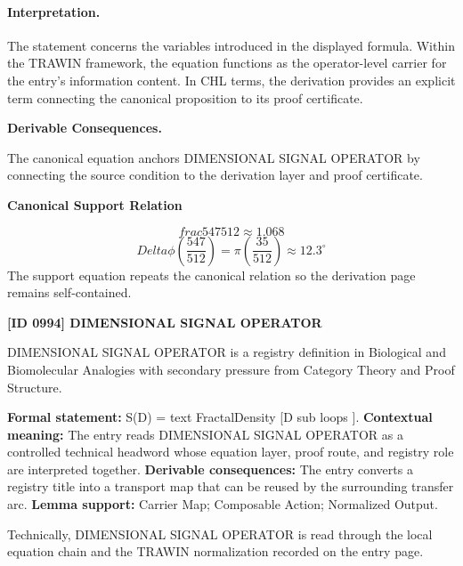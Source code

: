 \paragraph{Interpretation.}
The statement concerns the variables introduced in the displayed formula. Within the TRAWIN framework, the equation functions as the operator-level carrier for the entry’s information content. In CHL terms, the derivation provides an explicit term connecting the canonical proposition to its proof certificate.

\par\vspace{0.35em}
\noindent\textbf{Derivable Consequences.}\quad
\begingroup
\footnotesize
\raggedright
The canonical equation anchors DIMENSIONAL SIGNAL OPERATOR by connecting the source condition to the derivation layer and proof certificate.
\par\endgroup

\noindent\textbf{Canonical Support Relation}\par
\[
frac{547}{512} \approx 1.068
\]
\[
Delta\phi\left(\frac{547}{512}\right) = \pi\left(\frac{35}{512}\right) \approx 12.3^\circ
\]
\noindent The support equation repeats the canonical relation so the derivation page remains self-contained.\par

\clearpage
\noindent\textbf{[ID 0994] DIMENSIONAL SIGNAL OPERATOR}\par
\vspace{0.35em}
\begingroup\small
{}
DIMENSIONAL SIGNAL OPERATOR is a registry definition in Biological and Biomolecular Analogies with secondary pressure from Category Theory and Proof Structure.

\begingroup\footnotesize\setlength{\emergencystretch}{3em}\sloppy
\textbf{Formal statement:} S(D) = text FractalDensity [D sub loops ]. \textbf{Contextual meaning:} The entry reads DIMENSIONAL SIGNAL OPERATOR as a controlled technical headword whose equation layer, proof route, and registry role are interpreted together. \textbf{Derivable consequences:} The entry converts a registry title into a transport map that can be reused by the surrounding transfer arc. \textbf{Lemma support:} Carrier Map; Composable Action; Normalized Output.\par
\endgroup

Technically, DIMENSIONAL SIGNAL OPERATOR is read through the local equation chain and the TRAWIN normalization recorded on the entry page.

